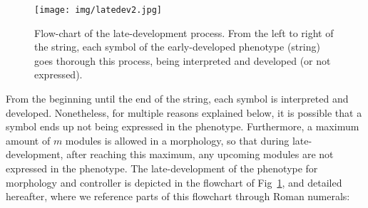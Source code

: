 \documentclass[utf8]{frontiersSCNS} %
\begin{document}
 \begin{figure}[t]
\begin{center}
\texttt{[image: img/latedev2.jpg]}
\caption{Flow-chart of the late-development process. From the left to right of the string, each symbol of the early-developed phenotype (string) goes thorough this process, being interpreted and developed (or not expressed).}
\label{fig:latedev}
\end{center}
\end{figure}


From the beginning until the end of the string, each symbol is interpreted and developed. Nonetheless, for multiple reasons explained below, it is possible that a symbol ends up not being expressed in the phenotype. Furthermore, a maximum amount of $m$ modules is allowed in a morphology, so that during late-development, after reaching this maximum, any upcoming modules are not expressed in the phenotype. The late-development of the phenotype for morphology and controller is depicted in the flowchart of Fig~\ref{fig:latedev}, and detailed hereafter, where we reference parts of this flowchart through Roman numerals:
\end{document}
